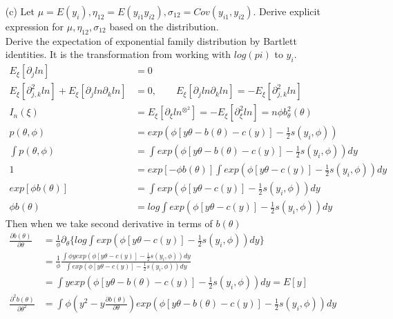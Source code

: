 \documentclass{homework}
\begin{document}
\begin{itemize}
        
      \item[(c)] Let $\mu = E(y_i), \eta_{12} = E(y_{i1}y_{i2}), \sigma_{12}=Cov(y_{i1},y_{i2})$. Derive explicit expression for $\mu, \eta_{12}, \sigma_{12}$ based on the distribution.\\
      Derive the expectation of exponential family distribution by Bartlett identities. It is the transformation from working with $log(pi)$ to $y_i$.
      \begin{align*}
        E_{\xi}[\partial_j ln] &= 0\\
        E_{\xi}[\partial^2_{j,k} ln] + E_{\xi}[\partial_{j} ln \partial_{k} ln ] &= 0, \qquad E_{\xi}[\partial_{j} ln \partial_{k} ln ] = - E_{\xi}[\partial^2_{j,k} ln]\\
        I_n(\xi) &= E_{\xi}[\partial_{\xi} ln ^{\otimes^2}] = -E_{\xi}[\partial^2_{\xi} ln] = n \phi b_{\theta}^2(\theta)\\
        p(\theta, \phi) &= exp(\phi[y\theta - b(\theta) - c(y)] - \frac{1}{2}s(y_i, \phi))\\
        \int p(\theta, \phi) &= \int exp \left(\phi[y\theta - b(\theta) - c(y)] - \frac{1}{2}s(y_i, \phi) \right) dy\\
        1 &= exp[- \phi b(\theta)] \int exp\left( \phi[y\theta  -c(y)]- \frac{1}{2}s(y_i, \phi)\right) dy\\
        exp[ \phi b(\theta)] &= \int exp\left( \phi[y\theta  -c(y)]- \frac{1}{2}s(y_i, \phi)\right) dy\\
        \phi b(\theta) &= log \int exp\left( \phi[y\theta  -c(y)]- \frac{1}{2}s(y_i, \phi)\right) dy
\end{align*}
Then when we take second derivative in terms of $b(\theta)$
      \begin{align*}
        \frac{\partial b(\theta)}{\partial \theta} &= \frac{1}{\phi} \partial_{\theta} \{ log \int exp\left( \phi[y\theta  -c(y)]- \frac{1}{2}s(y_i, \phi)\right) dy \}\\
        &= \frac{1}{\phi} \frac{\int \phi y exp\left( \phi[y\theta  -c(y)]- \frac{1}{2}s(y_i, \phi)\right) dy}{\int exp\left( \phi[y\theta  -c(y)]- \frac{1}{2}s(y_i, \phi)\right) dy}\\
        &= \int y exp \left(\phi[y\theta - b(\theta) - c(y)] - \frac{1}{2}s(y_i, \phi) \right) dy= E[y]\\
        \frac{\partial^2 b(\theta)}{\partial \theta^2} &= \int \phi (y^2 - y \frac{\partial b(\theta)}{\partial \theta}) exp \left(\phi[y\theta - b(\theta) - c(y)] - \frac{1}{2}s(y_i, \phi) \right) dy\\

\end{align*}
\end{itemize}
\end{document}
